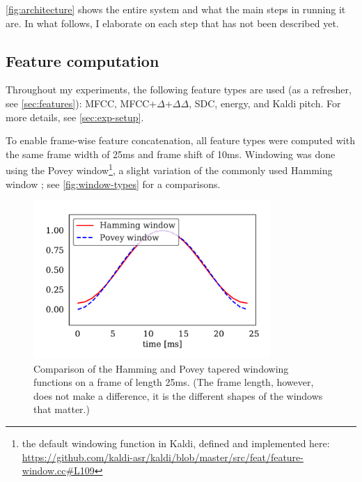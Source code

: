 \documentclass[bsc,frontabs,twoside,singlespacing,parskip,deptreport]{infthesis}
\begin{document}
{{    \autoref{fig:architecture} shows the entire system and what the main steps in running it are. In what follows, I elaborate on each step that has not been described yet.

    \subsection{Feature computation}{
      \label{sec:feature-computation}
      Throughout my experiments, the following feature types are used (as a refresher, see \autoref{sec:features}): MFCC, MFCC+$\Delta$+$\Delta\Delta$, SDC, energy, and Kaldi pitch. For more details, see \autoref{sec:exp-setup}.

      To enable frame-wise feature concatenation, all feature types were computed with the same frame width of 25ms and frame shift of 10ms. Windowing was done using the Povey window\footnote{the default windowing function in Kaldi, defined and implemented here: \url{https://github.com/kaldi-asr/kaldi/blob/master/src/feat/feature-window.cc\#L109}}, a slight variation of the commonly used Hamming window \citep[p. 200]{Blackman_Tukey_1958}; see \autoref{fig:window-types} for a comparisons.
      \begin{figure}[h!t]
        \centering
        \includegraphics[width=9cm]{../img/window-types.pdf}
        \vspace*{-1em}
        \caption{Comparison of the Hamming and Povey tapered windowing functions on a frame of length 25ms. (The frame length, however, does not make a difference, it is the different shapes of the windows that matter.)}
        \label{fig:window-types}
      \end{figure}

}}}
\end{document}
